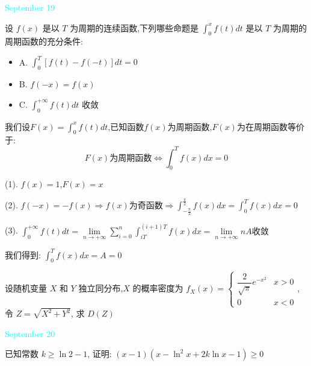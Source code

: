 \textcolor{cyan}{September 19}

\begin{example}[][Exam: 35.3.9]
	设 $f(x)$ 是以 $T$ 为周期的连续函数,下列哪些命题是 $\int_{0}^{x}f(t)dt$ 是以 $T$ 为周期的周期函数的充分条件:  
\begin{itemize}
	\item A. $\int_{0}^{T}\left[ f(t)-f(-t)\right]dt=0$
	\item B. $f(-x)=f(x)$
	\item C. $\int_{0}^{+\infty}f(t)dt$ 收敛
\end{itemize}
\end{example}

\begin{solution}

	我们设$F(x)=\int_{0}^{x}f(t)dt$,已知函数$f(x)$为周期函数,$F(x)$为在周期函数等价于:  
	$$F(x)\text{为周期函数}\Leftrightarrow \int_{0}^{T}f(x)dx=0$$
	
	(1). $f(x)=1$,$F(x)=x$
	
	(2). $f(-x)=-f(x)\Rightarrow f(x)\text{为奇函数}\Rightarrow \int_{-\frac{\pi}{2}}^{\frac{\pi}{2}}f(x)dx=\int_{0}^{T}f(x)dx=0$
	
	(3). $\int_{0}^{+\infty}f(t)dt=\lim\limits_{n\to+\infty}\sum\limits_{i=0}^{n}\int_{iT}^{(i+1)T}f(x)dx=\lim\limits_{n\to+\infty}nA\text{收敛}$
	
	我们得到:  $\int_{0}^{T}f(x)dx=A=0$
\end{solution}

\begin{example}[][Exam: 35.3.10]
	设随机变量 $X$ 和 $Y$ 独立同分布,$X$ 的概率密度为 $f_{X}(x)=
	\begin{cases}
		\dfrac{2}{\sqrt{\pi}}e^{-x^2} & x>0\\
		0 & x<0
	\end{cases}$,令 $Z=\sqrt{X^2+Y^2}$, 求 $D(Z)$
\end{example}

\begin{solution}
	
\end{solution}


\textcolor{cyan}{September 20}

\begin{example}[][Exam: 35.3.11]
	已知常数 $k\geq \ln2-1$, 证明: $(x-1)(x-\ln^2 x+2k\ln x-1)\geq 0$
\end{example}

